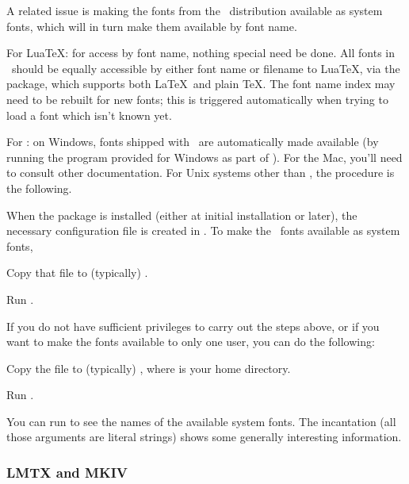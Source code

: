 \documentclass[12pt]{article}
\begin{document}
A related issue is making the fonts from the \TL\ distribution available
as system fonts, which will in turn make them available by font name.

For Lua\TeX: for access by font name, nothing special need be done. All
fonts in \TL\ should be equally accessible by either font name or
filename to Lua\TeX, via the  package, which
supports both \LaTeX\ and plain \TeX. The  font name
index may need to be rebuilt for new fonts; this is triggered
automatically when trying to load a font which isn't known yet.

For \XeTeX: on Windows, fonts shipped with \TL\ are automatically made
available (by running the  program provided for
Windows as part of \TL). For the Mac, you'll need to consult other
documentation. For Unix systems other than \macOS, the procedure is the
following.

When the  package is installed (either at initial
installation or later), the necessary configuration file is created in
. To make the
\TL\ fonts available as system fonts,
\begin{enumerate*}
\item Copy that  file to (typically)
.
\item Run .
\end{enumerate*}

If you do not have sufficient privileges to carry out the steps above,
or if you want to make the \TL{} fonts available to only one user,
you can do the following:
\begin{enumerate*}
\item Copy the  file to (typically)
      , where \filename{~} is
      your home directory.
\item Run .
\end{enumerate*}

You can run  to see the names of the available system
fonts. The incantation  (all
those arguments are literal strings) shows some generally interesting
information.


\subsubsection{\protect\ConTeXt{} LMTX and MKIV}
\label{sec:context} %
\label{sec:context-mkiv}
\end{document}

